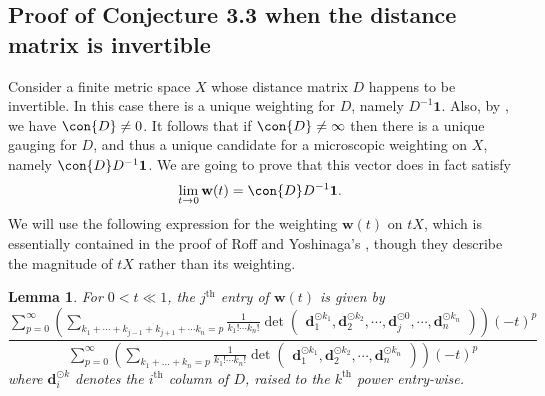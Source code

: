 \documentclass[a4paper, oneside, reqno]{amsart}
\newtheorem{lemma}[theorem]{Lemma}
\theoremstyle{definition}
\theoremstyle{remark}
\numberwithin{equation}{section}
\renewcommand{\vec}{\mathbf}
\renewcommand{\th}{\text{th}}
\newcommand{\onevector}{\mathbf{1}}
\begin{document}

\subsection{Proof of Conjecture 3.3 when the distance matrix is invertible}
\label{subsec:microwtg-invertible}

Consider a finite metric space \(X\) whose distance matrix \(D\) happens to be invertible. In this case there is a unique weighting for \(D\), namely \(D^{-1} \onevector\). Also, by , we have \(\con{D} \neq 0\). It follows that if \(\con{D} \not = \infty\) then there is a unique gauging for \(D\), and thus a unique candidate for a microscopic weighting on \(X\), namely \(\con{D} D^{-1} \onevector\). We are going to prove that this vector does in fact satisfy
\[\lim_{t \to 0} \vec{w}(t) = \con{D} D^{-1} \onevector.\]
We will use the following expression for the weighting \(\vec{w}(t)\) on \(tX\), which is essentially contained in the proof of Roff and Yoshinaga's \cite[Theorem~2.3]{RoffYoshinaga}, though they describe the magnitude of \(tX\) rather than its weighting.

\begin{lemma}
\label{lem:expansion}
    For \(0 < t \ll 1\), the \(j^\th\) entry of \(\vec{w}(t)\) is given by
    \begin{equation}
    \label{eq:expansions}
        \frac{
        \sum_{p=0}^\infty \left( \sum_{k_1 + \cdots + k_{j-1} + k_{j+1} + \cdots k_n=p} \frac{1}{k_1!\cdots k_n!}
        \det
        \begin{pmatrix}
        \vec{d}_1^{\odot k_1},
        \vec{d}_2^{\odot k_2},
        \cdots,
        \vec{d}_j^{\odot 0},
        \cdots,
        \vec{d}_n^{\odot k_n}
        \end{pmatrix} \right) (-t)^{p}
        }
        {
        \sum_{p=0}^\infty 
        \left(
        \sum_{k_1+ \dots +k_n=p} \frac{1}{k_1!\cdots k_n!}
        \det
        \begin{pmatrix}
        \vec{d}_1^{\odot k_1}, 
        \vec{d}_2^{\odot k_2}, 
        \cdots, 
        \vec{d}_n^{\odot k_n}
        \end{pmatrix}
        \right)
        (-t)^{p}
        }
    \end{equation}
    where \(\vec{d}_i^{\odot k}\) denotes the \(i^\th\) column of \(D\), raised to the \(k^\th\) power entry-wise.
\end{lemma}
\end{document}
